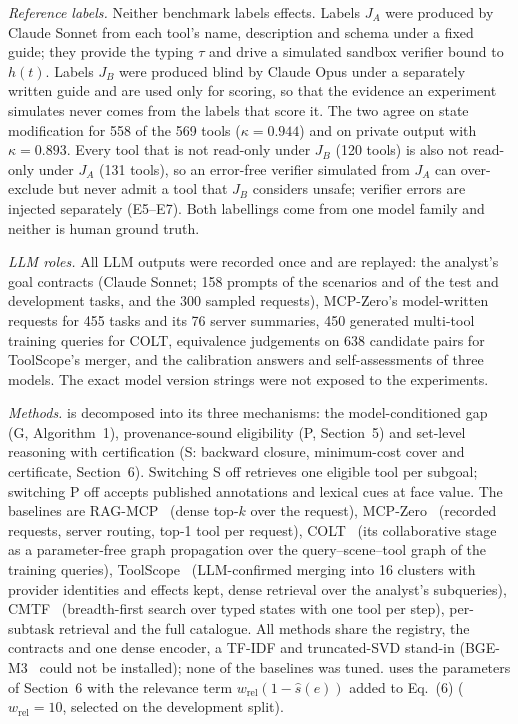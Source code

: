 \emph{Reference labels.} Neither benchmark labels effects. Labels $J_A$ were produced by Claude Sonnet from each
tool's name, description and schema under a fixed guide; they provide the typing $\tau$ and drive a simulated
sandbox verifier bound to $h(t)$. Labels $J_B$ were produced blind by Claude Opus under a separately written guide
and are used only for scoring, so that the evidence an experiment simulates never comes from the labels that
score it. The two agree on state modification for 558 of the 569 tools ($\kappa=0.944$) and on private output with
$\kappa=0.893$. Every tool that is not read-only under $J_B$ (120 tools) is also not read-only under $J_A$ (131
tools), so an error-free verifier simulated from $J_A$ can over-exclude but never admit a tool that $J_B$
considers unsafe; verifier errors are injected separately (E5--E7). Both labellings come from one model family
and neither is human ground truth.

\emph{LLM roles.} All LLM outputs were recorded once and are replayed: the analyst's goal contracts (Claude Sonnet;
158 prompts of the scenarios and of the test and development tasks, and the 300 sampled requests), MCP-Zero's model-written
requests for 455 tasks and its 76 server summaries, 450 generated multi-tool training queries for COLT,
equivalence judgements on 638 candidate pairs for ToolScope's merger, and the calibration answers and
self-assessments of three models. The exact model version strings were not exposed to the experiments.

\emph{Methods.} \pamcp{} is decomposed into its three mechanisms: the model-conditioned gap (G, Algorithm~1),
provenance-sound eligibility (P, Section~5) and set-level reasoning with certification (S: backward closure,
minimum-cost cover and certificate, Section~6). Switching S off retrieves one eligible tool per subgoal; switching
P off accepts published annotations and lexical cues at face value. The baselines are RAG-MCP~\cite{gan2025ragmcp}
(dense top-$k$ over the request), MCP-Zero~\cite{fei2025mcpzero} (recorded requests, server routing, top-1 tool
per request), COLT~\cite{qu2024colt} (its collaborative stage as a parameter-free graph propagation over the
query--scene--tool graph of the training queries), ToolScope~\cite{liu2026toolscope} (LLM-confirmed merging into
16 clusters with provider identities and effects kept, dense retrieval over the analyst's subqueries),
CMTF~\cite{suresh2026cmtf} (breadth-first search over typed states with one tool per step), per-subtask retrieval
and the full catalogue. All methods share the registry, the contracts and one dense encoder, a TF-IDF and
truncated-SVD stand-in (BGE-M3~\cite{chen2024bgem3} could not be installed); none of the baselines was tuned.
\pamcp{} uses the parameters of Section~6 with the relevance term $w_{\mathrm{rel}}(1-\hat{s}(e))$ added to
Eq.~(6) ($w_{\mathrm{rel}}=10$, selected on the development split).

